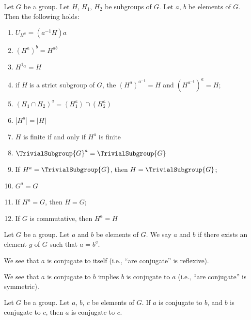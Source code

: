 \begin{theorem}
Let $G$ be a group. Let $H$, $H_{1}$, $H_{2}$ be subgroups of $G$.
Let $a$, $b$ be elements of $G$. Then the following holds:
\begin{enumerate}
\item{} $U_{H^{a}}=(a^{-1}H)a$
\item{} $(H^{a})^{b}=H^{ab}$
\item{} $H^{1_{G}}=H$
\item{} if $H$ is a strict subgroup of $G$, the $(H^{a})^{a^{-1}}=H$
and $(H^{a^{-1}})^{a}=H$;
\item{} $(H_{1}\cap H_{2})^{a}=(H_{1}^{a})\cap(H_{2}^{a})$
\item{} $|H^{a}|=|H|$
\item{} $H$ is finite if and only if $H^{a}$ is finite
\item{} $\TrivialSubgroup{G}^{a}=\TrivialSubgroup{G}$
\item{} If $H^{a}=\TrivialSubgroup{G}$, then $H=\TrivialSubgroup{G}$;
\item{} $G^{a}=G$
\item{} If $H^{a}=G$, then $H=G$;
\item{} If $G$ is commutative, then $H^{a}=H$
\end{enumerate}
\end{theorem}

\begin{definition}
Let $G$ be a group. Let $a$ and $b$ be elements of $G$.
We say $a$ and $b$  if there exists an element
$g$ of $G$ such that $a=b^{g}$.

We see that $a$ is conjugate to itself (i.e., ``are conjugate'' is reflexive).

We see that $a$ is conjugate to $b$ implies $b$ is conjugate to $a$
(i.e., ``are conjugate'' is symmetric).
\end{definition}

\begin{theorem}
Let $G$ be a group. Let $a$, $b$, $c$ be elements of $G$.
If $a$ is conjugate to $b$, and $b$ is conjugate to $c$, then $a$ is
conjugate to $c$.
\end{theorem}

